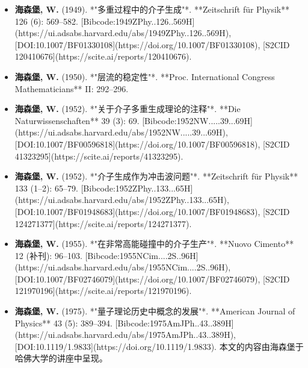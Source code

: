 \begin{itemize}
\item \textbf{海森堡, W.} (1949). *"多重过程中的介子生成"*. **Zeitschrift für Physik** 126 (6): 569–582. [Bibcode:1949ZPhy..126..569H](https://ui.adsabs.harvard.edu/abs/1949ZPhy..126..569H), [DOI:10.1007/BF01330108](https://doi.org/10.1007/BF01330108), [S2CID 120410676](https://scite.ai/reports/120410676).  
\item \textbf{海森堡, W.} (1950). *"层流的稳定性"*. **Proc. International Congress Mathematicians** II: 292–296.  
\item \textbf{海森堡, W.} (1952). *"关于介子多重生成理论的注释"*. **Die Naturwissenschaften** 39 (3): 69. [Bibcode:1952NW.....39...69H](https://ui.adsabs.harvard.edu/abs/1952NW.....39...69H), [DOI:10.1007/BF00596818](https://doi.org/10.1007/BF00596818), [S2CID 41323295](https://scite.ai/reports/41323295).  
\item \textbf{海森堡, W.} (1952). *"介子生成作为冲击波问题"*. **Zeitschrift für Physik** 133 (1–2): 65–79. [Bibcode:1952ZPhy..133...65H](https://ui.adsabs.harvard.edu/abs/1952ZPhy..133...65H), [DOI:10.1007/BF01948683](https://doi.org/10.1007/BF01948683), [S2CID 124271377](https://scite.ai/reports/124271377).  
\item \textbf{海森堡, W.} (1955). *"在非常高能碰撞中的介子生产"*. **Nuovo Cimento** 12 (补刊): 96–103. [Bibcode:1955NCim....2S..96H](https://ui.adsabs.harvard.edu/abs/1955NCim....2S..96H), [DOI:10.1007/BF02746079](https://doi.org/10.1007/BF02746079), [S2CID 121970196](https://scite.ai/reports/121970196).  
\item \textbf{海森堡, W.} (1975). *"量子理论历史中概念的发展"*. **American Journal of Physics** 43 (5): 389–394. [Bibcode:1975AmJPh..43..389H](https://ui.adsabs.harvard.edu/abs/1975AmJPh..43..389H), [DOI:10.1119/1.9833](https://doi.org/10.1119/1.9833). 本文的内容由海森堡于哈佛大学的讲座中呈现。
\end{itemize}
